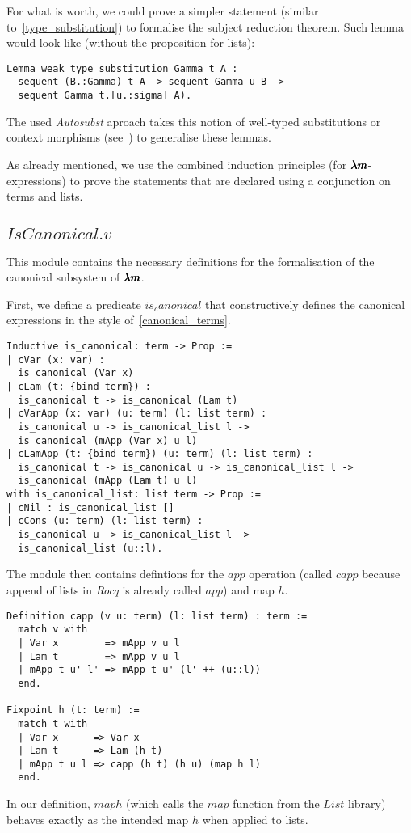 For what is worth, we could prove a simpler statement (similar to~\cref{type_substitution}) to formalise the subject reduction theorem.
Such lemma would look like (without the proposition for lists):
\begin{lstlisting}[language=Coq]
Lemma weak_type_substitution Gamma t A :
  sequent (B.:Gamma) t A -> sequent Gamma u B ->
  sequent Gamma t.[u.:sigma] A).
\end{lstlisting}

The used \textit{Autosubst} aproach takes this notion of well-typed substitutions or context morphisms (see~\cite[Chapter~4]{AutosubstSchafer}) to generalise these lemmas.

As already mentioned, we use the combined induction principles (for $\pmb{\lambda m}$-expressions) to prove the statements that are declared using a conjunction on terms and lists.

\subsection{\lst$IsCanonical.v$}

This module contains the necessary definitions for the formalisation of the canonical subsystem of $\pmb{\lambda m}$.

First, we define a predicate \lst$is_canonical$ that constructively defines the canonical expressions in the style of~\cref{canonical_terms}.
\begin{lstlisting}[language=Coq]
Inductive is_canonical: term -> Prop :=
| cVar (x: var) :
  is_canonical (Var x)
| cLam (t: {bind term}) :
  is_canonical t -> is_canonical (Lam t)
| cVarApp (x: var) (u: term) (l: list term) :
  is_canonical u -> is_canonical_list l ->
  is_canonical (mApp (Var x) u l)
| cLamApp (t: {bind term}) (u: term) (l: list term) :
  is_canonical t -> is_canonical u -> is_canonical_list l ->
  is_canonical (mApp (Lam t) u l)
with is_canonical_list: list term -> Prop :=
| cNil : is_canonical_list []
| cCons (u: term) (l: list term) :
  is_canonical u -> is_canonical_list l ->
  is_canonical_list (u::l).
\end{lstlisting}

The module then contains defintions for the $app$ operation (called \lst$capp$ because append of lists in \textit{Rocq} is already called \lst$app$) and map $h$.
\begin{lstlisting}[language=Coq]
Definition capp (v u: term) (l: list term) : term :=
  match v with
  | Var x        => mApp v u l
  | Lam t        => mApp v u l
  | mApp t u' l' => mApp t u' (l' ++ (u::l))
  end.

Fixpoint h (t: term) :=
  match t with
  | Var x      => Var x
  | Lam t      => Lam (h t)
  | mApp t u l => capp (h t) (h u) (map h l)
  end.
\end{lstlisting}
In our definition, \lst$map h$ (which calls the \lst$map$ function from the \lst$List$ library) behaves exactly as the intended map $h$ when applied to lists.

